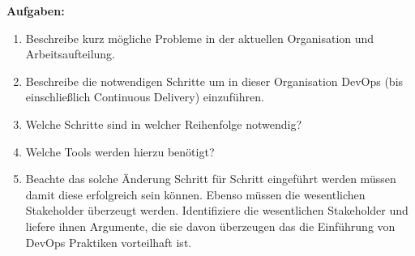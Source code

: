 \textbf{Aufgaben:}
\begin{enumerate}
    \item Beschreibe kurz mögliche Probleme in der aktuellen Organisation und Arbeitsaufteilung.\\
    


    \item Beschreibe die notwendigen Schritte um in dieser Organisation DevOps (bis einschließlich
    Continuous Delivery) einzuführen. \\


    
    \item Welche Schritte sind in welcher Reihenfolge notwendig? \\
    


    \item Welche Tools werden hierzu benötigt? \\
    
    
    \item Beachte das solche Änderung Schritt für Schritt eingeführt werden müssen damit diese
    erfolgreich sein können. Ebenso müssen die wesentlichen Stakeholder überzeugt werden.
    Identifiziere die wesentlichen Stakeholder und liefere ihnen Argumente, die sie davon
    überzeugen das die Einführung von DevOps Praktiken vorteilhaft ist. \\




\end{enumerate}

\newpage


